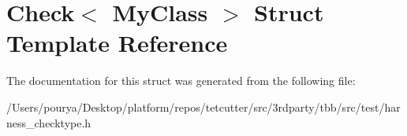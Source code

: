 \hypertarget{structCheck}{}\section{Check$<$ My\+Class $>$ Struct Template Reference}
\label{structCheck}


The documentation for this struct was generated from the following file\+:\begin{DoxyCompactItemize}
\item 
/\+Users/pourya/\+Desktop/platform/repos/tetcutter/src/3rdparty/tbb/src/test/harness\+\_\+checktype.\+h\end{DoxyCompactItemize}
